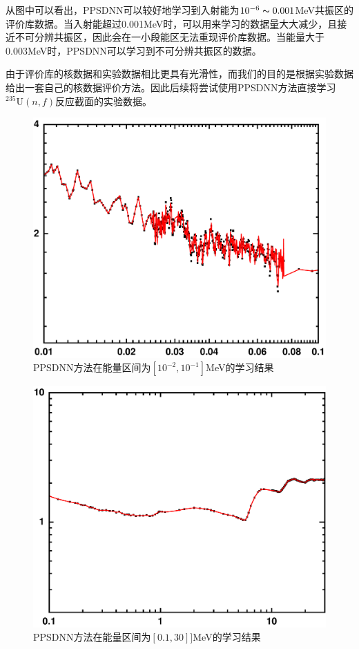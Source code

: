 从图中可以看出，PPSDNN可以较好地学习到入射能为$10^{-6}\thicksim 0.001$MeV共振区的评价库数据。当入射能超过0.001MeV时，可以用来学习的数据量大大减少，且接近不可分辨共振区，因此会在一小段能区无法重现评价库数据。当能量大于0.003MeV时，PPSDNN可以学习到不可分辨共振区的数据。

由于评价库的核数据和实验数据相比更具有光滑性，而我们的目的是根据实验数据给出一套自己的核数据评价方法。因此后续将尝试使用PPSDNN方法直接学习$^{235}\text{U}(n,f)$反应截面的实验数据。
\begin{figure}[htbp!]
  \centering
  \includegraphics[width=0.63\linewidth]{figures/endftrain/G2.pdf}
  \caption{PPSDNN方法在能量区间为$[10^{-2},10^{-1}]$MeV的学习结果}
  \label{endf2}
\end{figure}
\begin{figure}[htbp!]
  \centering
  \includegraphics[width=0.63\linewidth]{figures/endftrain/G1.pdf}
  \caption{PPSDNN方法在能量区间为$[0.1,30]]$MeV的学习结果}
  \label{endf1}
\end{figure}











